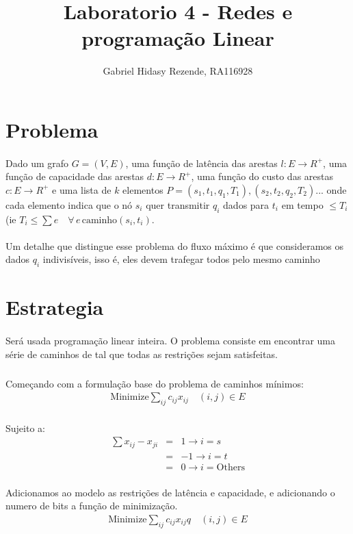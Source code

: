 \documentclass{article}
\title{Laboratorio 4 - Redes e programação Linear}
\author{Gabriel Hidasy Rezende, RA116928}
\begin{document}
\maketitle
\section*{Problema}
\paragraph{} Dado um grafo $G = (V,E)$, uma função de latência das
arestas $l:E \rightarrow R^+$, uma função de capacidade das arestas
$d: E \rightarrow R^+$, uma função do custo das arestas
$c: E \rightarrow R^+$ e uma lista de $k$ elementos
$P={(s_1,t_1,q_1,T_1),(s_2,t_2,q_2,T_2)...}$ onde cada elemento indica que o
nó $s_i$ quer transmitir $q_i$ dados para $t_i$ em tempo $\le T_i$ (ie
$T_i \le \sum{e} \quad \forall \, e\, \text{caminho}(s_i,t_i)$.
\paragraph{} Um detalhe que distingue esse problema do fluxo máximo é
que consideramos os dados $q_i$ indivisíveis, isso é, eles devem
trafegar todos pelo mesmo caminho
\section*{Estrategia}
\paragraph{} Será usada programação linear inteira. O problema
consiste em encontrar uma série de caminhos de 
tal que todas as restrições sejam satisfeitas.
\subparagraph{} Começando com a formulação base do problema de
caminhos mínimos:
\begin{align*}
  \text{Minimize} \sum_{ij}{c_{ij}x_{ij}} \quad (i,j) \in E
\end{align*}
\paragraph{} Sujeito a:
\begin{eqnarray*}
  \sum{x_{ij}-x_{ji}} &=& 1 \rightarrow i =s\\
  &=& -1 \rightarrow i = t\\
  &=& 0 \rightarrow i = \text{Others}
\end{eqnarray*}
\paragraph{} Adicionamos ao modelo as restrições de latência e
capacidade, e adicionando o numero de bits a função de minimização.
\begin{align*}
  \text{Minimize} \sum_{ij}{c_{ij}x_{ij}q} \quad (i,j) \in E
\end{align*}
\end{document}
